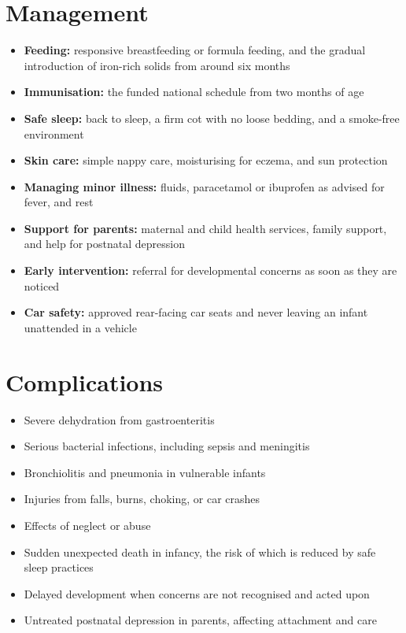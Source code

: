 \section*{Management}
\begin{itemize}
    \item \textbf{Feeding:} responsive breastfeeding or formula feeding, and the gradual introduction of iron-rich solids from around six months
    \item \textbf{Immunisation:} the funded national schedule from two months of age
    \item \textbf{Safe sleep:} back to sleep, a firm cot with no loose bedding, and a smoke-free environment
    \item \textbf{Skin care:} simple nappy care, moisturising for eczema, and sun protection
    \item \textbf{Managing minor illness:} fluids, paracetamol or ibuprofen as advised for fever, and rest
    \item \textbf{Support for parents:} maternal and child health services, family support, and help for postnatal depression
    \item \textbf{Early intervention:} referral for developmental concerns as soon as they are noticed
    \item \textbf{Car safety:} approved rear-facing car seats and never leaving an infant unattended in a vehicle
\end{itemize}

\section*{Complications}
\begin{itemize}
    \item Severe dehydration from gastroenteritis
    \item Serious bacterial infections, including sepsis and meningitis
    \item Bronchiolitis and pneumonia in vulnerable infants
    \item Injuries from falls, burns, choking, or car crashes
    \item Effects of neglect or abuse
    \item Sudden unexpected death in infancy, the risk of which is reduced by safe sleep practices
    \item Delayed development when concerns are not recognised and acted upon
    \item Untreated postnatal depression in parents, affecting attachment and care
\end{itemize}

